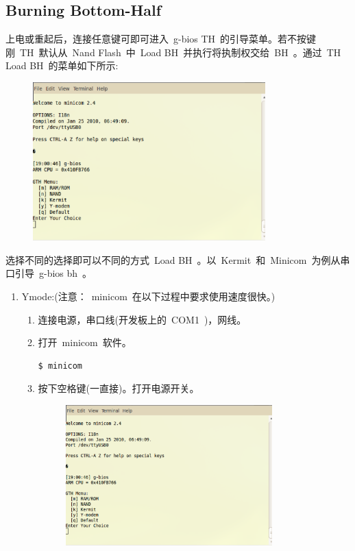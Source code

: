 \documentclass[a4paper,11pt]{book}
\begin{document}
\begin{CJK*}{UTF8}{gbsn}
\subsection{Burning Bottom-Half}
上电或重起后，连接任意键可即可进入~g-bios TH~的引导菜单。若不按键刚~TH~默认从~Nand Flash~中~Load BH~并执行将执制权交给~BH~。通过~TH Load BH~的菜单如下所示:
\begin{figure}[H]
\centering
\includegraphics[width=0.8\textwidth]{image/min_01.eps}
\end{figure}
选择不同的选择即可以不同的方式~Load BH~。以~Kermit~和~Minicom~为例从串口引导~g-bios bh~。
\begin{enumerate} \setlength{\itemsep}{-\itemsep}
\item Ymode:(注意：~minicom~在以下过程中要求使用速度很快。)
	\begin{enumerate} \setlength{\itemsep}{-\itemsep}
	\item 连接电源，串口线(开发板上的~COM1~)，网线。
	\item 打开~minicom~软件。
	\begin{lstlisting}[language=c,numbers=none]
	$ minicom
	\end{lstlisting}
	\item 按下空格键(一直接)。打开电源开关。
	\begin{figure}[H]
	\centering
	\includegraphics[width=0.8\textwidth]{image/min_01.eps}

\end{figure}
\end{enumerate}
\end{enumerate}
\end{CJK*}
\end{document}
